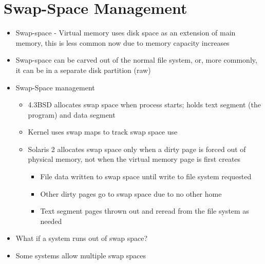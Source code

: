 \documentclass{article}[18pt]
\begin{document}
\section{Swap-Space Management}
\begin{itemize}
	\item Swap-space  - Virtual memory uses disk space as an extension of main memory, this is less common now due to memory capacity increases
	\item Swap-space can be carved out of the normal file system, or, more commonly, it can be in a separate disk partition (raw)
	\item Swap-Space management
	\begin{itemize}
		\item 4.3BSD allocates swap space when process starts; holds text segment (the program) and data segment
		\item Kernel uses swap maps to track swap space use
		\item Solaris 2 allocates swap space only when a dirty page is forced out of physical memory, not when the virtual memory page is first creates
		\begin{itemize}
			\item File data written to swap space until write to file system requested
			\item Other dirty pages go to swap space due to no other home
			\item Text segment pages thrown out and reread from the file system as needed
		\end{itemize} 
	\end{itemize}
	\item What if a system runs out of swap space?
	\item Some systems allow multiple swap spaces
\end{itemize}
\end{document}
